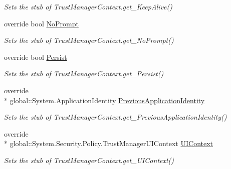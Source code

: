 \begin{DoxyCompactItemize}
\begin{DoxyCompactList}\small\item\em Sets the stub of Trust\-Manager\-Context.\-get\-\_\-\-Keep\-Alive()\end{DoxyCompactList}\item 
override bool \hyperlink{class_system_1_1_security_1_1_policy_1_1_fakes_1_1_stub_trust_manager_context_a2b850b98035e9f991050e27e4cfa82b3}{No\-Prompt}
\begin{DoxyCompactList}\small\item\em Sets the stub of Trust\-Manager\-Context.\-get\-\_\-\-No\-Prompt()\end{DoxyCompactList}\item 
override bool \hyperlink{class_system_1_1_security_1_1_policy_1_1_fakes_1_1_stub_trust_manager_context_a8a80981c5b5fdc9f112ca9f1bd5590ab}{Persist}
\begin{DoxyCompactList}\small\item\em Sets the stub of Trust\-Manager\-Context.\-get\-\_\-\-Persist()\end{DoxyCompactList}\item 
override \\*
global\-::\-System.\-Application\-Identity \hyperlink{class_system_1_1_security_1_1_policy_1_1_fakes_1_1_stub_trust_manager_context_a607ca6c8527dcd2dd3aedb20d40cab5b}{Previous\-Application\-Identity}
\begin{DoxyCompactList}\small\item\em Sets the stub of Trust\-Manager\-Context.\-get\-\_\-\-Previous\-Application\-Identity()\end{DoxyCompactList}\item 
override \\*
global\-::\-System.\-Security.\-Policy.\-Trust\-Manager\-U\-I\-Context \hyperlink{class_system_1_1_security_1_1_policy_1_1_fakes_1_1_stub_trust_manager_context_a27fe169ba01ad0c4d2f5cb620e6fcdb6}{U\-I\-Context}
\begin{DoxyCompactList}\small\item\em Sets the stub of Trust\-Manager\-Context.\-get\-\_\-\-U\-I\-Context()\end{DoxyCompactList}\end{DoxyCompactItemize}


